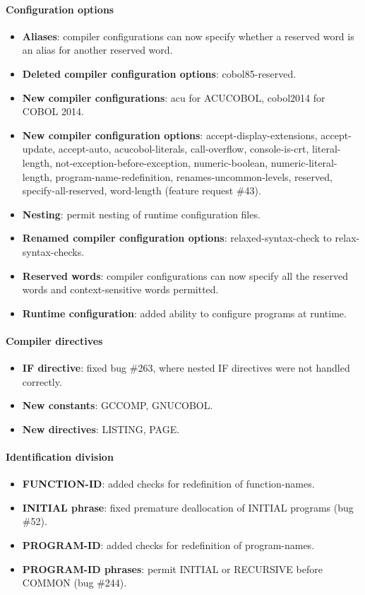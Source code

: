 \paragraph{Configuration options}
\begin{itemize}
\item \textbf{Aliases}: compiler configurations can now specify whether a reserved word is an alias for another reserved word.
\item \textbf{Deleted compiler configuration options}: cobol85-reserved.
\item \textbf{New compiler configurations}: acu for ACUCOBOL, cobol2014 for COBOL 2014.
\item \textbf{New compiler configuration options}: accept-display-extensions, accept-update, accept-auto, acucobol-literals, call-overflow, console-is-crt, literal-length, not-exception-before-exception, numeric-boolean, numeric-literal-length, program-name-redefinition, renames-uncommon-levels, reserved, specify-all-reserved, word-length (feature request \#43).
\item \textbf{Nesting}: permit nesting of runtime configuration files.
\item \textbf{Renamed compiler configuration options}: relaxed-syntax-check to relax-syntax-checks.
\item \textbf{Reserved words}: compiler configurations can now specify all the reserved words and context-sensitive words permitted.
\item \textbf{Runtime configuration}: added ability to configure programs at runtime.
\end{itemize}

\paragraph{Compiler directives}
\begin{itemize}
\item \textbf{\directiveindicator{}IF directive}: fixed bug \#263, where nested \directiveindicator{}IF directives were not handled correctly.
\item \textbf{New constants}: GCCOMP, GNUCOBOL.
\item \textbf{New directives}: \directiveindicator{}LISTING, \directiveindicator{}PAGE.
\end{itemize}

\paragraph{Identification division}
\begin{itemize}
\item \textbf{FUNCTION-ID}: added checks for redefinition of function-names.
\item \textbf{INITIAL phrase}: fixed premature deallocation of INITIAL programs (bug \#52).
\item \textbf{PROGRAM-ID}: added checks for redefinition of program-names.
\item \textbf{PROGRAM-ID phrases}: permit INITIAL or RECURSIVE before COMMON (bug \#244).
\end{itemize}

